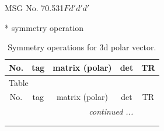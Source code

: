 \documentclass[fleqn,8pt]{jsarticle}
\begin{document}
\setcounter{MaxMatrixCols}{32}

\renewcommand{\tablename}{Table~}
\renewcommand{\figurename}{Figure~}
\begin{center}
\LARGE
MSG No. 70.531\quad$Fd'd'd'$
\end{center}
* symmetry operation
\renewcommand{\arraystretch}{1.3}
\begin{longtable}{ccccc}
\caption{Symmetry operations for 3d polar vector.}
 \\
 \hline \hline
No. & tag & matrix (polar) & det & TR \\ \hline \endfirsthead

\multicolumn{4}{l}{\tablename\ \thetable{}} \\
 \hline \hline
No. & tag & matrix (polar) & det & TR \\ \hline \endhead

 \hline \hline
\multicolumn{4}{r}{\footnotesize\it continued ...} \\ \endfoot

 \hline \hline
\multicolumn{4}{r}{} \\ \endlastfoot


\end{longtable}
\end{document}
